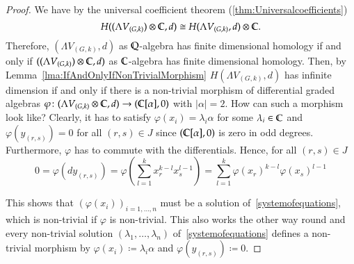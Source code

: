 \begin{proof}
 We have by the universal coefficient theorem (\ref{thm:Universalcoefficients})
 $$ H ((\Lambda V_{(G,k)}) \otimes \mathbb{C}, d) \cong H(\Lambda V_{(G,k)}, d) \otimes \mathbb{C}. $$ 
 Therefore, $(\Lambda V_{(G,k)}, d)$ as  $\mathbb{Q}$-algebra has finite dimensional homology if and only if
 ${((\Lambda V_{(G,k)}) \otimes \mathbb{C} , d)}$ as $\mathbb{C}$-algebra has finite dimensional homology. Then, by
 Lemma~\ref{lma:IfAndOnlyIfNonTrivialMorphism} $H(\Lambda V_{(G,k)},d)$  has infinite dimension if and only if 
 there is a non-trivial morphism of differential graded algebras 
 ${\varphi \colon (\Lambda V_{(G,k)} \otimes \mathbb{C},d)  \to ( \mathbb{C} [\alpha] , 0)}$ with $|\alpha| = 2$. How can such a morphism look like?
 Clearly, it has to satisfy $\varphi(x_i) = \lambda_i \alpha$ for some $\lambda_i \in \mathbb{C}$ and $\varphi(y_{(r,s)}) = 0$ for all $(r,s) \in J$  since 
 $(\mathbb{C} [\alpha] , 0)$ is zero in odd degrees. Furthermore, $\varphi$ has to commute with the differentials. Hence, 
 for all $(r,s) \in J$
 $$ 0 = \varphi(dy_{(r,s)}) = \varphi(\sum_{l = 1}^k x_r^{k -l} x_s^{l - 1})
 = \sum_{l = 1}^k \varphi(x_r)^{k -l} \varphi(x_s)^{l - 1}$$
 
 This shows that $(\varphi(x_i))_{i = 1, \dotsc , n}$ must be a solution of~\ref{systemofequations}, which is non-trivial
 if $\varphi$ is non-trivial.
 This also works the other way round and every non-trivial solution  $(\lambda_1 , \dotsc, \lambda_n)$ of~\ref{systemofequations}
 defines a non-trivial morphism by $\varphi(x_i) \coloneqq \lambda_i \alpha$ and $\varphi(y_{(r,s)}) \coloneqq 0$.
 \end{proof}

